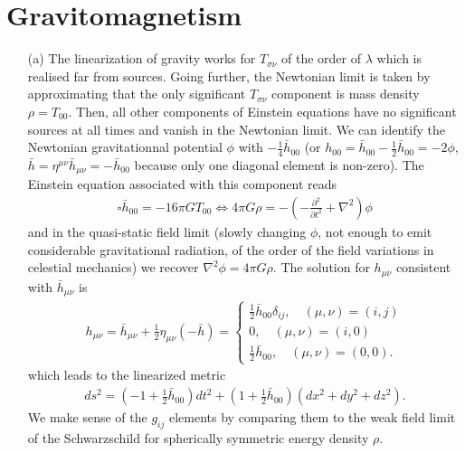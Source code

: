 \documentclass[10pt, a4paper]{article}
\begin{document}
\section{Gravitomagnetism}
\begin{enumerate}
  \item[(a)] The linearization of gravity works for $T_{\sigma \nu}$ of the order of $\lambda$ which is realised far from sources. Going further, the Newtonian limit is taken by approximating that the only significant $T_{\sigma \nu}$ component is mass density $\rho = T_{00}$. Then, all other components of Einstein equations have no significant sources at all times and vanish in the Newtonian limit. We can identify the Newtonian gravitationnal potential $\phi$ with $-\frac{1}{4} \bar{h}_{00}$ (or $h_{00} = \bar{h}_{00} - \frac{1}{2}\bar{h}_{00} = -2\phi$, $\bar{h} = \eta^{\mu\nu}\bar{h}_{\mu\nu} =-\bar{h}_{00}$ because only one diagonal element is non-zero). The Einstein equation associated with this component reads 
  \begin{align*}
    \square\bar{h}_{00} = -16\pi G T_{00} \iff 4\pi G \rho = -\left(-\frac{\partial^2}{\partial t^2} + \nabla^2 \right) \phi
  \end{align*}
  and in the quasi-static field limit (slowly changing $\phi$, not enough to emit considerable gravitational radiation, of the order of the field variations in celestial mechanics) we recover $\nabla^2 \phi = 4\pi G \rho$. The solution for $h_{\mu\nu}$ consistent with $\bar{h}_{\mu \nu}$ is 
  \begin{align*}
    h_{\mu \nu} =  \bar{h}_{\mu \nu} + \frac{1}{2}\eta_{\mu \nu} (-\bar{h}) = \begin{cases}
    \frac{1}{2}\bar{h}_{00}\delta_{ij}, \quad  (\mu, \nu) = (i, j)\\
    0, \quad (\mu, \nu) = (i, 0)\\
    \frac{1}{2}\bar{h}_{00}, \quad (\mu, \nu) = (0, 0).
    \end{cases}
  \end{align*}
  which leads to the linearized metric 
  \begin{align*}
    ds^2 = \left(-1+\frac{1}{2}\bar{h}_{00}\right)dt^2 + \left(1+\frac{1}{2}\bar{h}_{00}\right)(dx^2 + dy^2 + dz^2).
  \end{align*}
  We make sense of the $g_{ij}$ elements by comparing them to the weak field limit of the Schwarzschild for spherically symmetric energy density $\rho$. 
  

\end{enumerate}
\end{document}
